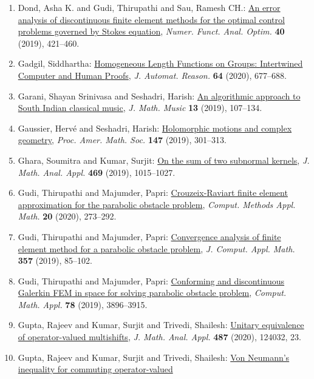 \begin{enumerate}
{for convection-diffusion-reaction problems}, \emph{Numer. Methods Partial Differential Equations} {\bf 35} (2019), 638--663.
\item Dond, Asha K. and Gudi, Thirupathi and Sau, Ramesh CH.: \href{https://doi.org/10.1080/01630563.2018.1538158}{An error analysis of discontinuous finite element methods for
the optimal control problems governed by {S}tokes equation}, \emph{Numer. Funct. Anal. Optim.} {\bf 40} (2019), 421--460.
\item Gadgil, Siddhartha: \href{https://doi.org/10.1007/s10817-019-09523-1}{Homogeneous {L}ength {F}unctions on {G}roups: {I}ntertwined
{C}omputer and {H}uman {P}roofs}, \emph{J. Automat. Reason.} {\bf 64} (2020), 677--688.
\item Garani, Shayan Srinivasa and Seshadri, Harish: \href{https://doi.org/10.1080/17459737.2019.1604845}{An algorithmic approach to {S}outh {I}ndian classical music}, \emph{J. Math. Music} {\bf 13} (2019), 107--134.
\item Gaussier, Herv\'{e} and Seshadri, Harish: \href{https://doi.org/10.1090/proc/14217}{Holomorphic motions and complex geometry}, \emph{Proc. Amer. Math. Soc.} {\bf 147} (2019), 301--313.
\item Ghara, Soumitra and Kumar, Surjit: \href{https://doi.org/10.1016/j.jmaa.2018.09.048}{On the sum of two subnormal kernels}, \emph{J. Math. Anal. Appl.} {\bf 469} (2019), 1015--1027.
\item Gudi, Thirupathi and Majumder, Papri: \href{https://doi.org/10.1515/cmam-2019-0057}{Crouzeix-{R}aviart finite element approximation for the
parabolic obstacle problem}, \emph{Comput. Methods Appl. Math.} {\bf 20} (2020), 273--292.
\item Gudi, Thirupathi and Majumder, Papri: \href{https://doi.org/10.1016/j.cam.2019.02.026}{Convergence analysis of finite element method for a parabolic
obstacle problem}, \emph{J. Comput. Appl. Math.} {\bf 357} (2019), 85--102.
\item Gudi, Thirupathi and Majumder, Papri: \href{https://doi.org/10.1016/j.camwa.2019.06.022}{Conforming and discontinuous {G}alerkin {FEM} in space for
solving parabolic obstacle problem}, \emph{Comput. Math. Appl.} {\bf 78} (2019), 3896--3915.
\item Gupta, Rajeev and Kumar, Surjit and Trivedi, Shailesh: \href{https://doi.org/10.1016/j.jmaa.2020.124032}{Unitary equivalence of operator-valued multishifts}, \emph{J. Math. Anal. Appl.} {\bf 487} (2020), 124032, 23.
\item Gupta, Rajeev and Kumar, Surjit and Trivedi, Shailesh: \href{https://doi.org/10.1090/proc/14410}{Von {N}eumann's inequality for commuting operator-valued
}
\end{enumerate}

